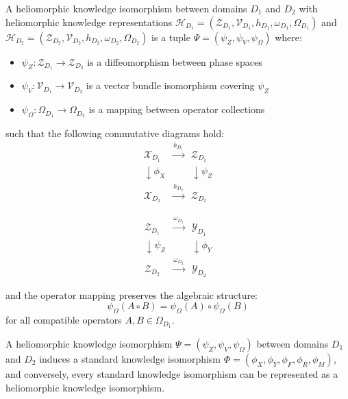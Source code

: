 \begin{definition}
A heliomorphic knowledge isomorphism between domains $D_1$ and $D_2$ with heliomorphic knowledge representations $\mathcal{H}_{D_1} = (\mathcal{Z}_{D_1}, \mathcal{V}_{D_1}, h_{D_1}, \omega_{D_1}, \Omega_{D_1})$ and $\mathcal{H}_{D_2} = (\mathcal{Z}_{D_2}, \mathcal{V}_{D_2}, h_{D_2}, \omega_{D_2}, \Omega_{D_2})$ is a tuple $\Psi = (\psi_Z, \psi_V, \psi_{\Omega})$ where:
\begin{itemize}
    \item $\psi_Z: \mathcal{Z}_{D_1} \to \mathcal{Z}_{D_2}$ is a diffeomorphism between phase spaces
    \item $\psi_V: \mathcal{V}_{D_1} \to \mathcal{V}_{D_2}$ is a vector bundle isomorphism covering $\psi_Z$
    \item $\psi_{\Omega}: \Omega_{D_1} \to \Omega_{D_2}$ is a mapping between operator collections
\end{itemize}
such that the following commutative diagrams hold:
\begin{equation}
\begin{array}{ccc}
\mathcal{X}_{D_1} & \xrightarrow{h_{D_1}} & \mathcal{Z}_{D_1} \\
\downarrow \phi_X & & \downarrow \psi_Z \\
\mathcal{X}_{D_2} & \xrightarrow{h_{D_2}} & \mathcal{Z}_{D_2}
\end{array}
\end{equation}

\begin{equation}
\begin{array}{ccc}
\mathcal{Z}_{D_1} & \xrightarrow{\omega_{D_1}} & \mathcal{Y}_{D_1} \\
\downarrow \psi_Z & & \downarrow \phi_Y \\
\mathcal{Z}_{D_2} & \xrightarrow{\omega_{D_2}} & \mathcal{Y}_{D_2}
\end{array}
\end{equation}

and the operator mapping preserves the algebraic structure:
\begin{equation}
\psi_{\Omega}(A \circ B) = \psi_{\Omega}(A) \circ \psi_{\Omega}(B)
\end{equation}
for all compatible operators $A, B \in \Omega_{D_1}$.
\end{definition}

\begin{theorem}
A heliomorphic knowledge isomorphism $\Psi = (\psi_Z, \psi_V, \psi_{\Omega})$ between domains $D_1$ and $D_2$ induces a standard knowledge isomorphism $\Phi = (\phi_X, \phi_Y, \phi_F, \phi_R, \phi_M)$, and conversely, every standard knowledge isomorphism can be represented as a heliomorphic knowledge isomorphism.
\end{theorem}

